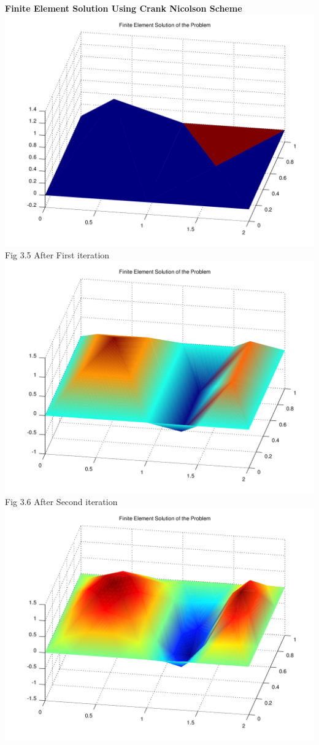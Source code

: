 \documentclass{report}
\numberwithin{equation}{chapter}
\begin{document}
\newpage
\begin{center}
\textbf{Finite Element Solution Using Crank Nicolson  Scheme}\\
\includegraphics[scale=0.58]{11}\hspace*{70cm}
{Fig 3.5 After First iteration}
\includegraphics[scale=0.58]{22}\hspace*{70cm}
{Fig 3.6 After Second iteration}
\includegraphics[scale=0.58]{33}\hspace*{70cm}

\end{center}
\end{document}
